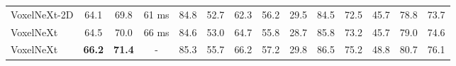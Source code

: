 \documentclass[10pt,twocolumn,letterpaper]{article}
\begin{document}
{\begin{table*}[t]
\begin{center}
{\begin{tabular}{|l|ccc|cccccccccc|}
\hline \hline
VoxelNeXt-2D  & 64.1 & 69.8 & 61 ms &  84.8 & 52.7 & 62.3 & 56.2 & 29.5 & 84.5 & 72.5 & 45.7 & 78.8 & 73.7 \\ 
VoxelNeXt  & 64.5 & 70.0  & 66 ms & 84.6 & 53.0 & 64.7 & 55.8 & 28.7 & 85.8 & 73.2 & 45.7 & 79.0 & 74.6 \\ 
VoxelNeXt  & \textbf{66.2} & \textbf{71.4} & - & 85.3 & 55.7 & 66.2 & 57.2 & 29.8 & 86.5 & 75.2 & 48.8 & 80.7 & 76.1 \\ 
\hline
\end{tabular}}
\label{tab:nuscenes-test}
\end{center}
\end{table*}
\begin{table}[t]
\begin{center}
\caption{Performance of nuScenes 3D tracking test split for LIDAR-only methods, without multi-modal extension.  is based on the double-flip 3D object detection results in Tab.~\ref{tab:nuscenes-test}.}
\label{tab:nuscenee-tracking-test}
\end{center}
\end{table}
}
\end{document}
